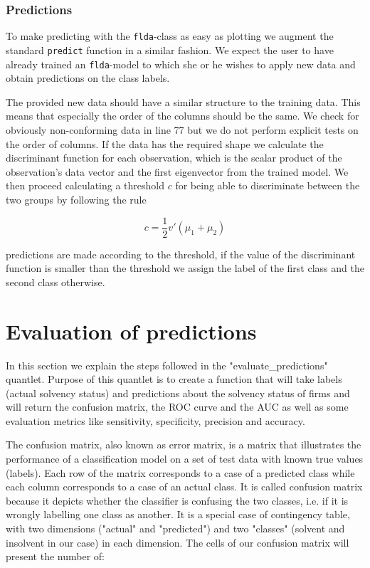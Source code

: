 \documentclass{article}
\begin{document}
\subsubsection{Predictions}

To make predicting with the \texttt{flda}-class as easy as plotting we augment the standard \texttt{predict} function in a similar fashion. We expect the user to have already trained an \texttt{flda}-model to which she or he wishes to apply new data and obtain predictions on the class labels. 



The provided new data should have a similar structure to the training data. This means that especially the order of the columns should be the same. We check for obviously non-conforming data in line 77 but we do not perform explicit tests on the order of columns. If the data has the required shape we calculate the discriminant function for each observation, which is the scalar product of the observation's data vector and the first eigenvector from the trained model. We then proceed calculating a threshold $c$ for being able to discriminate between the two groups by following the rule

\begin{equation}
c = \frac{1}{2} v \prime \left(\mu_1 + \mu_2\right) 
\end{equation}

predictions are made according to the threshold, if the value of the discriminant function is smaller than the threshold we assign the label of the first class and the second class otherwise. 

\section{Evaluation of predictions}

In this section we explain the steps followed in the "evaluate\_predictions" quantlet. Purpose of this quantlet is to create a function that will take labels (actual solvency status) and predictions about the solvency status of firms and will return the confusion matrix, the ROC curve and the AUC as well as some evaluation metrics like sensitivity, specificity, precision and accuracy.

The confusion matrix, also known as error matrix, is a matrix that illustrates the performance of a classification model on a set of test data with known true values (labels). Each row of the matrix corresponds to a case of a predicted class while each column corresponds to a case of an actual class. It is called confusion matrix because it depicts whether the classifier is confusing the two classes, i.e. if it is wrongly labelling one class as another. It is a special case of contingency table, with two dimensions ("actual" and "predicted") and two "classes" (solvent and insolvent in our case) in each dimension. The cells of our confusion matrix will present the number of:
\end{document}
